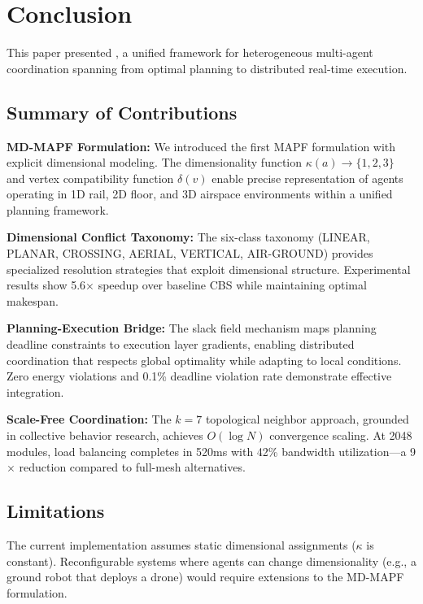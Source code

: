 \section{Conclusion}
\label{sec:conclusion}

This paper presented \mapfhet{}, a unified framework for heterogeneous multi-agent coordination spanning from optimal planning to distributed real-time execution.

\subsection{Summary of Contributions}

\textbf{MD-MAPF Formulation:} We introduced the first MAPF formulation with explicit dimensional modeling. The dimensionality function $\kappa(a) \rightarrow \{1,2,3\}$ and vertex compatibility function $\delta(v)$ enable precise representation of agents operating in 1D rail, 2D floor, and 3D airspace environments within a unified planning framework.

\textbf{Dimensional Conflict Taxonomy:} The six-class taxonomy (LINEAR, PLANAR, CROSSING, AERIAL, VERTICAL, AIR-GROUND) provides specialized resolution strategies that exploit dimensional structure. Experimental results show 5.6$\times$ speedup over baseline CBS while maintaining optimal makespan.

\textbf{Planning-Execution Bridge:} The slack field mechanism maps planning deadline constraints to execution layer gradients, enabling distributed coordination that respects global optimality while adapting to local conditions. Zero energy violations and 0.1\% deadline violation rate demonstrate effective integration.

\textbf{Scale-Free Coordination:} The $k=7$ topological neighbor approach, grounded in collective behavior research, achieves $O(\log N)$ convergence scaling. At 2048 modules, load balancing completes in 520ms with 42\% bandwidth utilization—a 9$\times$ reduction compared to full-mesh alternatives.

\subsection{Limitations}

The current implementation assumes static dimensional assignments ($\kappa$ is constant). Reconfigurable systems where agents can change dimensionality (e.g., a ground robot that deploys a drone) would require extensions to the MD-MAPF formulation.

